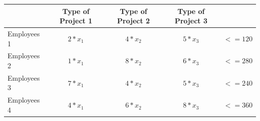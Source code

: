 \documentclass[a4paper,11pt]{scrartcl}
\begin{document}
\begin{tabular}{|l |c| c| c| c| }
\hline
& Type of Project 1 &  Type of Project 2 &  Type of Project 3&  \\
\hline
Employees 1 & \begin{math} 2*x_1 \end{math} & \begin{math}4*x_2  \end{math} & \begin{math} 5*x_3 \end{math} & \begin{math}  <=120 \end{math} \\
\hline
Employees 2 & \begin{math} 1*x_1 \end{math} & \begin{math} 8*x_2 \end{math} & \begin{math} 6*x_3 \end{math}& \begin{math} <=280 \end{math} \\
\hline
Employees 3 & \begin{math} 7*x_1 \end{math} & \begin{math} 4*x_2  \end{math}& \begin{math} 5*x_3 \end{math}& \begin{math} <=240 \end{math} \\
\hline
Employees 4 & \begin{math}4*x_1 \end{math}  & \begin{math} 6*x_2 \end{math} & \begin{math} 8*x_3 \end{math}& \begin{math} <=360 \end{math}  \\
\hline



\end{tabular}
\end{document}
